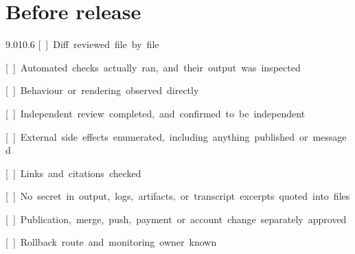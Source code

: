 \documentclass[11pt,a4paper,twoside,openany]{book}
\newcommand{\cl}[1]{\noindent\mbox{#1}\par}
\begin{document}
\FloatBarrier
\section*{Before release}

\begin{codeblock}{9.0}{10.6}
\cl{[~]~Diff~reviewed~file~by~file}
\cl{[~]~Automated~checks~actually~ran,~and~their~output~was~inspected}
\cl{[~]~Behaviour~or~rendering~observed~directly}
\cl{[~]~Independent~review~completed,~and~confirmed~to~be~independent}
\cl{[~]~External~side~effects~enumerated,~including~anything~published~or~messaged}
\cl{[~]~Links~and~citations~checked}
\cl{[~]~No~secret~in~output,~logs,~artifacts,~or~transcript~excerpts~quoted~into~files}
\cl{[~]~Publication,~merge,~push,~payment~or~account~change~separately~approved}
\cl{[~]~Rollback~route~and~monitoring~owner~known}
\end{codeblock}
\end{document}
